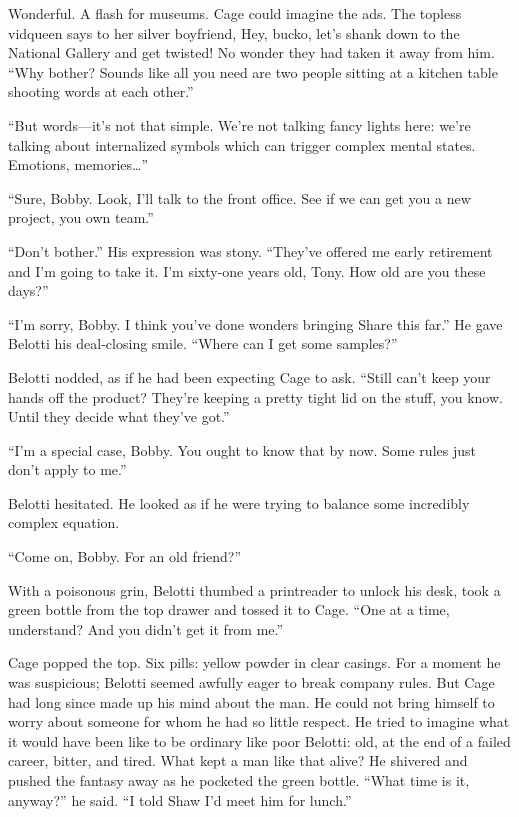 Wonderful. A flash for museums. Cage could imagine the ads. The topless vidqueen says to her silver boyfriend, Hey, bucko, let’s shank down to the National Gallery and get twisted! No wonder they had taken it away from him. “Why bother? Sounds like all you need are two people sitting at a kitchen table shooting words at each other.”

“But words—it’s not that simple. We’re not talking fancy lights here: we’re talking about internalized symbols which can trigger complex mental states. Emotions, memories…”

“Sure, Bobby. Look, I’ll talk to the front office. See if we can get you a new project, you own team.”

“Don’t bother.” His expression was stony. “They’ve offered me early retirement and I’m going to take it. I’m sixty-one years old, Tony. How old are you these days?”

“I’m sorry, Bobby. I think you’ve done wonders bringing Share this far.” He gave Belotti his deal-closing smile. “Where can I get some samples?”

Belotti nodded, as if he had been expecting Cage to ask. “Still can’t keep your hands off the product? They’re keeping a pretty tight lid on the stuff, you know. Until they decide what they’ve got.”

“I’m a special case, Bobby. You ought to know that by now. Some rules just don’t apply to me.”

Belotti hesitated. He looked as if he were trying to balance some incredibly complex equation.

“Come on, Bobby. For an old friend?”

With a poisonous grin, Belotti thumbed a printreader to unlock his desk, took a green bottle from the top drawer and tossed it to Cage. “One at a time, understand? And you didn’t get it from me.”

Cage popped the top. Six pills: yellow powder in clear casings. For a moment he was suspicious; Belotti seemed awfully eager to break company rules. But Cage had long since made up his mind about the man. He could not bring himself to worry about someone for whom he had so little respect. He tried to imagine what it would have been like to be ordinary like poor Belotti: old, at the end of a failed career, bitter, and tired. What kept a man like that alive? He shivered and pushed the fantasy away as he pocketed the green bottle. “What time is it, anyway?” he said. “I told Shaw I’d meet him for lunch.”

